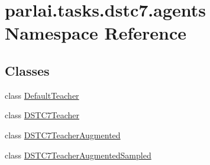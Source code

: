 \hypertarget{namespaceparlai_1_1tasks_1_1dstc7_1_1agents}{}\section{parlai.\+tasks.\+dstc7.\+agents Namespace Reference}
\label{namespaceparlai_1_1tasks_1_1dstc7_1_1agents}
\subsection*{Classes}
\begin{DoxyCompactItemize}
\item 
class \hyperlink{classparlai_1_1tasks_1_1dstc7_1_1agents_1_1DefaultTeacher}{Default\+Teacher}
\item 
class \hyperlink{classparlai_1_1tasks_1_1dstc7_1_1agents_1_1DSTC7Teacher}{D\+S\+T\+C7\+Teacher}
\item 
class \hyperlink{classparlai_1_1tasks_1_1dstc7_1_1agents_1_1DSTC7TeacherAugmented}{D\+S\+T\+C7\+Teacher\+Augmented}
\item 
class \hyperlink{classparlai_1_1tasks_1_1dstc7_1_1agents_1_1DSTC7TeacherAugmentedSampled}{D\+S\+T\+C7\+Teacher\+Augmented\+Sampled}
\end{DoxyCompactItemize}

